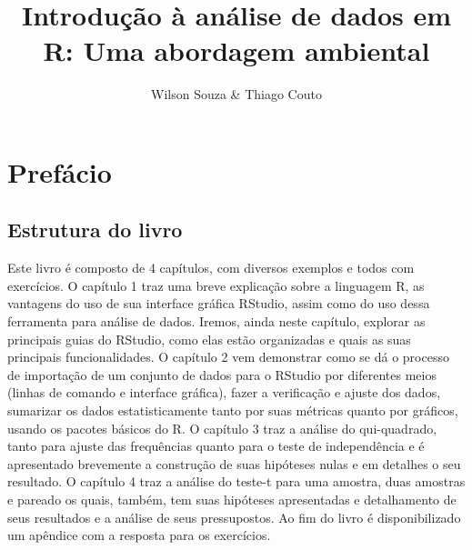 \documentclass[14pt,titlepage, oneside, openany, a4paper]{book}
\title{Introdução à análise de dados em R: Uma abordagem ambiental}
\author{Wilson Souza \& Thiago Couto}
\date{}
\let\oldmaketitle\maketitle
\begin{document}
\maketitle


\begin{figure}
  
\end{figure}

\let\maketitle\oldmaketitle
\maketitle

\renewcommand*\contentsname{Índice}
{
\hypersetup{linkcolor=}
\setcounter{tocdepth}{1}
\tableofcontents
}
\listoftables
\listoffigures
\hypertarget{prefuxe1cio}{%
\chapter*{Prefácio}\label{prefuxe1cio}}

\hypertarget{estrutura-do-livro}{%
\section*{Estrutura do livro}\label{estrutura-do-livro}}

Este livro é composto de 4 capítulos, com diversos exemplos e todos com exercícios. O capítulo 1 traz uma breve explicação sobre a linguagem R, as vantagens do uso de sua interface gráfica RStudio, assim como do uso dessa ferramenta para análise de dados. Iremos, ainda neste capítulo, explorar as principais guias do RStudio, como elas estão organizadas e quais as suas principais funcionalidades. O capítulo 2 vem demonstrar como se dá o processo de importação de um conjunto de dados para o RStudio por diferentes meios (linhas de comando e interface gráfica), fazer a verificação e ajuste dos dados, sumarizar os dados estatisticamente tanto por suas métricas quanto por gráficos, usando os pacotes básicos do R. O capítulo 3 traz a análise do qui-quadrado, tanto para ajuste das frequências quanto para o teste de independência e é apresentado brevemente a construção de suas hipóteses nulas e em detalhes o seu resultado. O capítulo 4 traz a análise do teste-t para uma amostra, duas amostras e pareado os quais, também, tem suas hipóteses apresentadas e detalhamento de seus resultados e a análise de seus pressupostos. Ao fim do livro é disponibilizado um apêndice com a resposta para os exercícios.
\end{document}
